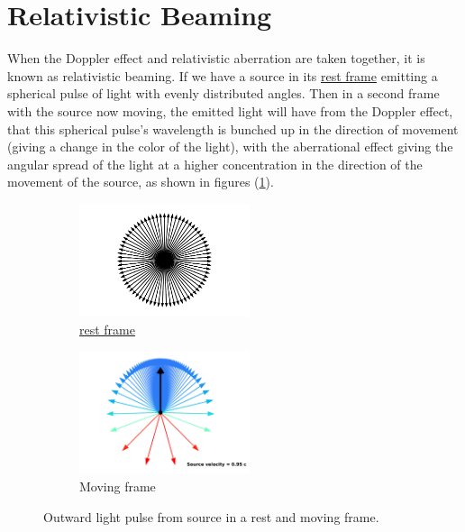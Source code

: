 \section{Relativistic Beaming}

When the Doppler effect and relativistic aberration are taken together, it is known as relativistic beaming.
If we have a source in its \hyperlink{def-proper-frame}{rest frame} emitting a spherical pulse of light with evenly distributed angles.
Then in a second frame with the source now moving, the emitted light will have from the Doppler effect, that this spherical pulse's wavelength is bunched up in the direction of movement (giving a change in the color of the light), with the aberrational effect giving the angular spread of the light at a higher concentration in the direction of the movement of the source, as shown in figures (\ref{fig: Relativistic Beaming}).

\begin{figure}[H]
	\begin{subfigure}{.49\textwidth}
		\centering
		\includegraphics[width=5cm]{images/pdf/Rest_velocities.pdf}
		\caption{\hyperlink{def-proper-frame}{rest frame}}
	\end{subfigure}
	\begin{subfigure}{.49\textwidth}
		\centering
		\includegraphics[width=5cm]{images/pdf/Aberrated_velocities.pdf}
		\caption{Moving frame}
	\end{subfigure}
	\caption{Outward light pulse from source in a rest and moving frame.}
	\label{fig: Relativistic Beaming}
\end{figure}

